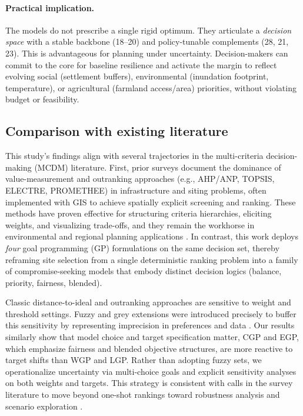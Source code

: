 \paragraph{Practical implication.}
The models do not prescribe a single rigid optimum. They articulate a \textit{decision space} with a stable backbone (18--20) and policy-tunable complements (28, 21, 23). This is advantageous for planning under uncertainty. Decision-makers can commit to the core for baseline resilience and activate the margin to reflect evolving social (settlement buffers), environmental (inundation footprint, temperature), or agricultural (farmland access/area) priorities, without violating budget or feasibility.


\subsection{Comparison with existing literature}
This study's findings align with several trajectories in the multi-criteria decision-making (MCDM) literature. First, prior surveys document the dominance of value-measurement and outranking approaches (e.g., AHP/ANP, TOPSIS, ELECTRE, PROMETHEE) in infrastructure and siting problems, often implemented with GIS to achieve spatially explicit screening and ranking. These methods have proven effective for structuring criteria hierarchies, eliciting weights, and visualizing trade-offs, and they remain the workhorse in environmental and regional planning applications \cite{Aruldoss2013,Taherdoost2023}. In contrast, this work deploys \textit{four} goal programming (GP) formulations on the same decision set, thereby reframing site selection from a single deterministic ranking problem into a family of compromise-seeking models that embody distinct decision logics (balance, priority, fairness, blended)\cite{jones2010}.

Classic distance-to-ideal and outranking approaches are sensitive to weight and threshold settings. Fuzzy and grey extensions were introduced precisely to buffer this sensitivity by representing imprecision in preferences and data \cite{LIANG1999,Mardani2015}. Our results similarly show that model choice and target specification matter, CGP and EGP, which emphasize fairness and blended objective structures, are more reactive to target shifts than WGP and LGP. Rather than adopting fuzzy sets, we operationalize uncertainty via multi-choice goals and explicit sensitivity analyses on both weights and targets. This strategy is consistent with calls in the survey literature to move beyond one-shot rankings toward robustness analysis and scenario exploration \cite{Aruldoss2013,Taherdoost2023}.

